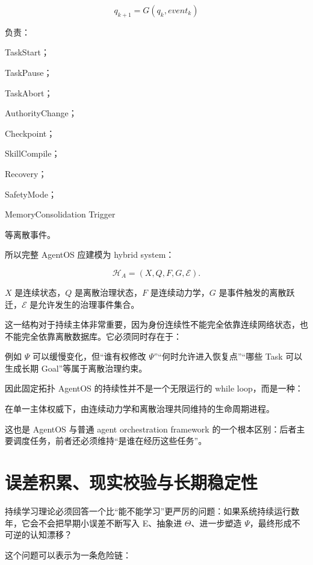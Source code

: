 \[
q_{k+1}
=
G(q_k,event_k)
\]

负责：

TaskStart；

TaskPause；

TaskAbort；

AuthorityChange；

Checkpoint；

SkillCompile；

Recovery；

SafetyMode；

MemoryConsolidation Trigger

等离散事件。

所以完整 AgentOS 应建模为 hybrid system：

\[
\boxed{
\mathcal{H}_A
=
(X,Q,F,G,\mathcal{E}).
}
\]

$X$ 是连续状态，$Q$ 是离散治理状态，$F$ 是连续动力学，$G$ 是事件触发的离散跃迁，$\mathcal{E}$ 是允许发生的治理事件集合。

这一结构对于持续主体非常重要，因为身份连续性不能完全依靠连续网络状态，也不能完全依靠离散数据库。它必须同时存在于：

\begin{statementbox}
\centering
{}
\end{statementbox}

例如 $\Psi$ 可以缓慢变化，但“谁有权修改 $\Psi$”“何时允许进入恢复点”“哪些 Task 可以生成长期 Goal”等属于离散治理约束。

因此固定拓扑 AgentOS 的持续性并不是一个无限运行的 while loop，而是一种：

\begin{statementbox}
在单一主体权威下，由连续动力学和离散治理共同维持的生命周期进程。
\end{statementbox}

这也是 AgentOS 与普通 agent orchestration framework 的一个根本区别：后者主要调度任务，前者还必须维持“是谁在经历这些任务”。

\section{误差积累、现实校验与长期稳定性}

持续学习理论必须回答一个比“能不能学习”更严厉的问题：如果系统持续运行数年，它会不会把早期小误差不断写入 E、抽象进 $\Theta$、进一步塑造 $\Psi$，最终形成不可逆的认知漂移？

这个问题可以表示为一条危险链：

